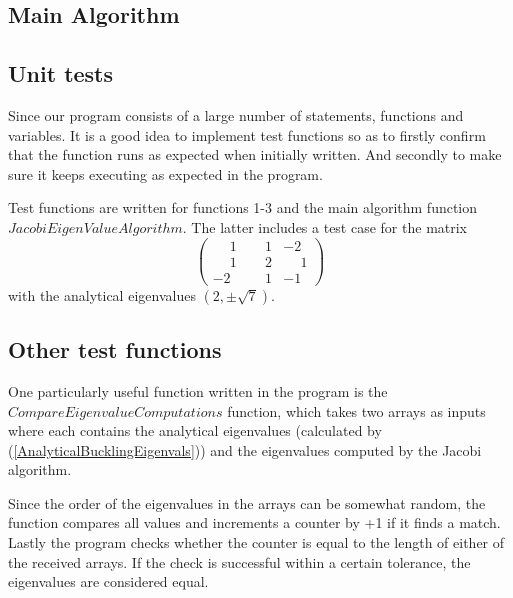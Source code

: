 \documentclass[aip,nobalancelastpage,
twocolumn,
rsi,%
 amsmath,amssymb,
 reprint,%
]{revtex4}
\begin{document}
\subsection{Main Algorithm}

\begin{algorithmic}[H]
\ELSE
  \ENDIF
 \ENDWHILE 
\end{algorithmic}

\subsection{Unit tests}
Since our program consists of a large number of statements, functions and variables. It is a good idea to implement test functions so as to firstly confirm that the function runs as expected when initially written. And secondly to make sure it keeps executing as expected in the program.\par
Test functions are written for functions 1-3 and the main algorithm function $JacobiEigenValueAlgorithm$. The latter includes a test case for the matrix
\begin{equation}
\begin{pmatrix}
\phantom{-}1 & \phantom{-}1 & -2 \\ \phantom{-}1 & \phantom{-}2 & \phantom{-}1 \\ -2 & \phantom{-}1 & -1
\end{pmatrix}
\end{equation}
with the analytical eigenvalues $(2,\pm \sqrt{7})$.
\subsection{Other test functions}
One particularly useful function written in the program is the $CompareEigenvalueComputations$ function, which takes two arrays as inputs where each contains the analytical eigenvalues (calculated by (\ref{AnalyticalBucklingEigenvals})) and the eigenvalues computed by the Jacobi algorithm.\par
Since the order of the eigenvalues in the arrays can be somewhat random, the function compares all values and increments a counter by +1 if it finds a match. Lastly the program checks whether the counter is equal to the length of either of the received arrays. If the check is successful within a certain tolerance, the eigenvalues are considered equal. 
\end{document}
